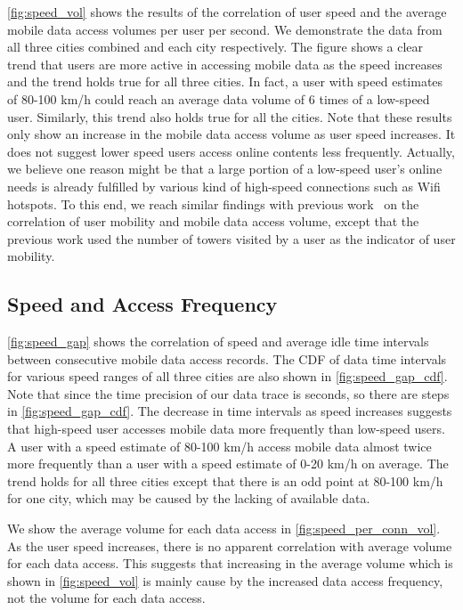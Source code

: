 \autoref{fig:speed_vol} shows the results of the correlation of user speed and the average mobile data access volumes per user per second. We demonstrate the data from all three cities combined and each city respectively. The figure shows a clear trend that users are more active in accessing mobile data as the speed increases and the trend holds true for all three cities. In fact, a user with speed estimates of 80-100 km/h could reach an average data volume of 6 times of a low-speed user. Similarly, this trend also holds true for all the cities. Note that these results only show an increase in the mobile data access volume as user speed increases. It does not suggest lower speed users access online contents less frequently. Actually, we believe one reason might be that a large portion of a low-speed user's online needs is already fulfilled by various kind of high-speed connections such as Wifi hotspots. To this end, we reach similar findings with previous work~\cite{yang2015characterizing} on the correlation of user mobility and mobile data access volume, except that the previous work used the number of towers visited by a user as the indicator of user mobility.

\subsection{Speed and Access Frequency}

\autoref{fig:speed_gap} shows the correlation of speed and average idle time intervals between consecutive mobile data access records.  The CDF of data time intervals for various speed ranges of all three cities are also shown in \autoref{fig:speed_gap_cdf}. Note that since the time precision of our data trace is seconds, so there are steps in \autoref{fig:speed_gap_cdf}. The decrease in time intervals as speed increases suggests that high-speed user accesses mobile data more frequently than low-speed users. A user with a speed estimate of 80-100 km/h access mobile data almost twice more frequently than a user with a speed estimate of 0-20 km/h on average. The trend holds for all three cities except that there is an odd point at 80-100 km/h for one city, which may be caused by the lacking of available data.

We show the average volume for each data access in \autoref{fig:speed_per_conn_vol}. As the user speed increases, there is no apparent correlation with average volume for each data access. This suggests that increasing in the average volume which is shown in \autoref{fig:speed_vol} is mainly cause by the increased data access frequency, not the volume for each data access.

